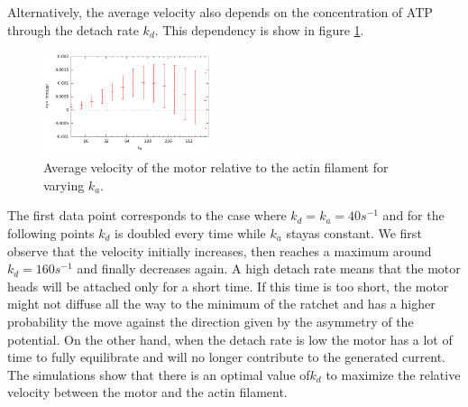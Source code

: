 \documentclass[aps,pre,twocolumn,showpacs,showkeys,a4paper]{revtex4}
\begin{document}
Alternatively, the average velocity also depends on the concentration of ATP through the detach rate $k_{d}$. 
This dependency is show in figure \ref{Fig: v_k}.
\begin{figure}[t]
\centering
\includegraphics[width=0.45\textwidth,height=!]{v_k}
\caption{Average velocity of the motor relative to the actin filament for varying $k_{a}$.}
\label{Fig: v_k} 
\end{figure}
The first data point corresponds to the case where $k_{d} = k_{a} = 40 s^{-1}$ and for the following points $k_{d}$ is doubled every time while $k_{a}$ stayas constant. 
We first observe that the velocity initially increases, then reaches a maximum around $k_{d} = 160 s^{-1}$ and finally decreases again. 
A high detach rate means that the motor heads will be attached only for a short time. 
If this time is too short, the motor might not diffuse all the way to the minimum of the ratchet and has a higher probability the move against the direction given by the asymmetry of the potential. 
On the other hand, when the detach rate is low the motor has a lot of time to fully equilibrate and will no longer contribute to the generated current. 
The simulations show that there is an optimal value of$k_{d}$ to maximize the relative velocity between the motor and the actin filament. 
\end{document}
